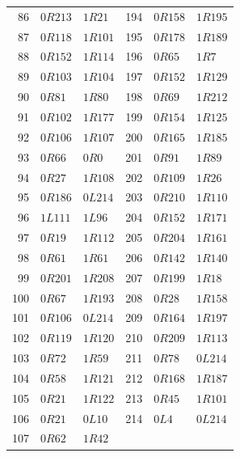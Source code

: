 \begin{longtable}{rll@{\qquad}rll}
86 & $0R213$ & $1R21$ & 194 & $0R158$ & $1R195$\\
87 & $0R118$ & $1R101$ & 195 & $0R178$ & $1R189$\\
88 & $0R152$ & $1R114$ & 196 & $0R65$ & $1R7$\\
89 & $0R103$ & $1R104$ & 197 & $0R152$ & $1R129$\\
90 & $0R81$ & $1R80$ & 198 & $0R69$ & $1R212$\\
91 & $0R102$ & $1R177$ & 199 & $0R154$ & $1R125$\\
92 & $0R106$ & $1R107$ & 200 & $0R165$ & $1R185$\\
93 & $0R66$ & $0R0$ & 201 & $0R91$ & $1R89$\\
94 & $0R27$ & $1R108$ & 202 & $0R109$ & $1R26$\\
95 & $0R186$ & $0L214$ & 203 & $0R210$ & $1R110$\\
96 & $1L111$ & $1L96$ & 204 & $0R152$ & $1R171$\\
97 & $0R19$ & $1R112$ & 205 & $0R204$ & $1R161$\\
98 & $0R61$ & $1R61$ & 206 & $0R142$ & $1R140$\\
99 & $0R201$ & $1R208$ & 207 & $0R199$ & $1R18$\\
100 & $0R67$ & $1R193$ & 208 & $0R28$ & $1R158$\\
101 & $0R106$ & $0L214$ & 209 & $0R164$ & $1R197$\\
102 & $0R119$ & $1R120$ & 210 & $0R209$ & $1R113$\\
103 & $0R72$ & $1R59$ & 211 & $0R78$ & $0L214$\\
104 & $0R58$ & $1R121$ & 212 & $0R168$ & $1R187$\\
105 & $0R21$ & $1R122$ & 213 & $0R45$ & $1R101$\\
106 & $0R21$ & $0L10$ & 214 & $0L4$ & $0L214$\\
107 & $0R62$ & $1R42$ & & &\\
\bottomrule
\end{longtable}
\renewcommand{\arraystretch}{1}\normalsize
